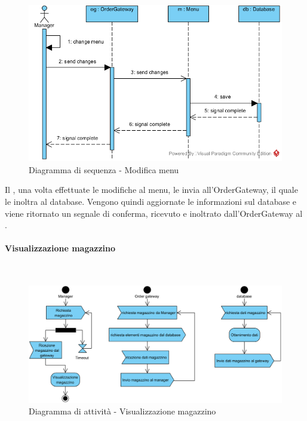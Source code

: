 \begin{figure}[H]
	\centering
	\includegraphics[width=14cm]{../../documenti/SpecificaTecnica/diagrammi_img/sequenza/direttore_modifica_menu.png}
	\caption{Diagramma di sequenza - Modifica menu}
\end{figure}
Il \Manager{}, una volta effettuate le modifiche al menu, le invia all'Order\-Gateway, il quale le inoltra al database. Vengono quindi aggiornate le informazioni sul database e viene ritornato un segnale di conferma, ricevuto e inoltrato dall'Order\-Gateway al \Manager{}.


\paragraph{Visualizzazione magazzino}\mbox{}\\
\nopagebreak
\begin{figure}[H]
	\centering
	\includegraphics[width=14cm]{diagrammi_img/attivita/manager_mag.png}
	\caption{Diagramma di attività - Visualizzazione magazzino}
\end{figure}

